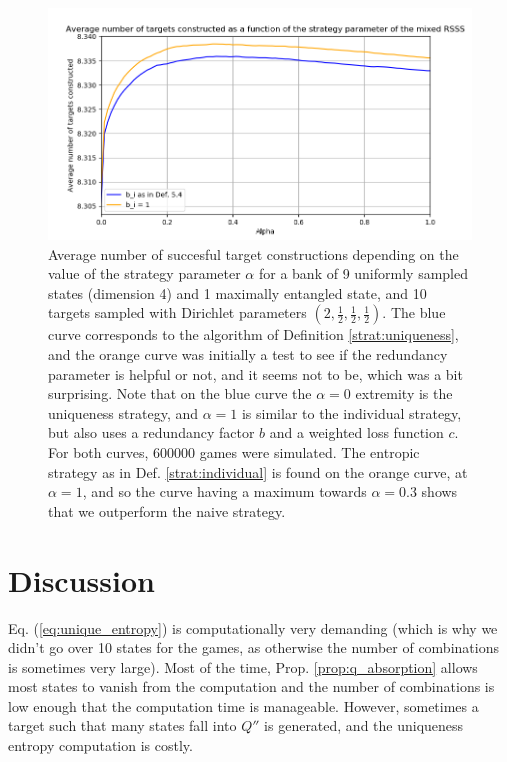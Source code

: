 \begin{figure}[h!]
    \centering
    \includegraphics[scale=0.6]{images/locc_comparison.png}
    \caption{Average number of succesful target constructions depending on the value of the strategy parameter $\alpha$ for a bank of 9 uniformly sampled states (dimension 4) and 1 maximally entangled state, and 10 targets sampled with Dirichlet parameters $\left(2, \frac{1}{2}, \frac{1}{2}, \frac{1}{2}\right)$. The blue curve corresponds to the algorithm of Definition \ref{strat:uniqueness}, and the orange curve was initially a test to see if the redundancy parameter is helpful or not, and it seems not to be, which was a bit surprising. Note that on the blue curve the $\alpha = 0$ extremity is the uniqueness strategy, and $\alpha = 1$ is similar to the individual strategy, but also uses a redundancy factor $b$ and a weighted loss function $c$. For both curves, 600000 games were simulated. The entropic strategy as in Def. \ref{strat:individual} is found on the orange curve, at $\alpha = 1$, and so the curve having a maximum towards $\alpha = 0.3$ shows that we outperform the naive strategy.}
    \label{fig:strategy_comparison}
\end{figure}

\section{Discussion} \label{sec:strategies_discussion}

Eq. (\ref{eq:unique_entropy}) is computationally very demanding (which is why we didn't go over 10 states for the games, as otherwise the number of combinations is sometimes very large). Most of the time, Prop. \ref{prop:q_absorption} allows most states to vanish from the computation and the number of combinations is low enough that the computation time is manageable. However, sometimes a target such that many states fall into $Q''$ is generated, and the uniqueness entropy computation is costly.

